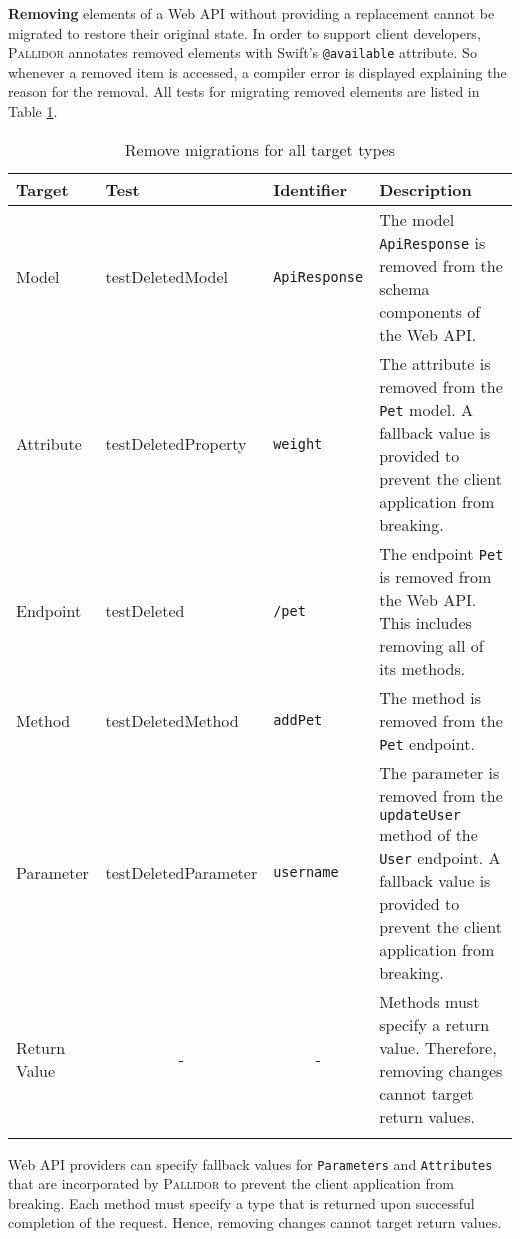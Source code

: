 \vspace{0.25cm}
\textbf{Removing} elements of a Web API without providing a replacement cannot be migrated to restore their original state. In order to support client developers, \textsc{Pallidor} annotates removed elements with Swift's \texttt{@available} attribute. So whenever a removed item is accessed, a compiler error is displayed explaining the reason for the removal. All tests for migrating removed elements are listed in Table \ref{tab:RemoveMigrationTests}.

	\begin{center}
		\begin{longtable}{@{}lp{}lp{}@{}}
			\toprule
			\textbf{Target} & \textbf{Test} & \textbf{Identifier} & \textbf{Description} \\ \midrule \endhead
			Model           &   test\-Deleted\-Model   &   \texttt{ApiResponse}      &  The model \texttt{ApiResponse} is removed from the schema components of the Web API.      \\
			Attribute       &  test\-Deleted\-Property    &  \texttt{weight}   &   The attribute is removed from the \texttt{Pet} model. A fallback value is provided to prevent the client application from breaking.       \\
			Endpoint        &  test\-Deleted    &    \texttt{/pet}     &   The endpoint \texttt{Pet} is removed from the Web API. This includes removing all of its methods. \\
			Method        &  test\-Deleted\-Method       &    \texttt{addPet}    &       The method is removed from the \texttt{Pet} endpoint.                          \\
			Parameter       &  test\-Deleted\-Parameter      &    \texttt{username}       &   The parameter is removed from the \texttt{updateUser} method of the \texttt{User} endpoint. A fallback value is provided to prevent the client application from breaking.        \\ 
			 Return Value    &            \multicolumn{1}{c}{-}  &    \multicolumn{1}{c}{-}                   &      Methods must specify a return value. Therefore, removing changes cannot target return values.    \\ \bottomrule
					\caption{Remove migrations for all target types}
			\label{tab:RemoveMigrationTests}
		\end{longtable}
	\end{center}
\vspace{-1cm}
Web API providers can specify fallback values for \texttt{Parameters} and \texttt{Attributes} that are incorporated by \textsc{Pallidor} to prevent the client application from breaking. Each method must specify a type that is returned upon successful completion of the request. Hence, removing changes cannot target return values. 

